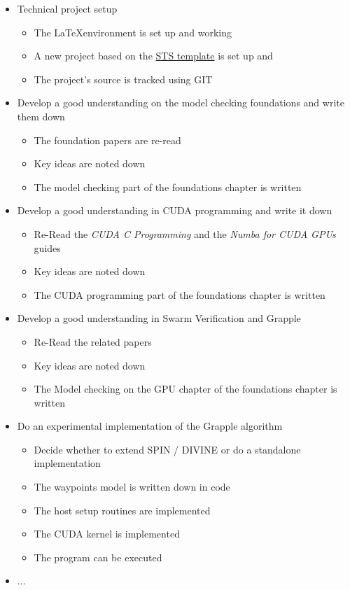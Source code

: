 \documentclass[a4paper]{scrartcl}
\begin{document}
\begin{itemize}
    \item Technical project setup
          \begin{itemize}
              \item The \LaTeX environment is set up and working
              \item A new project based on the \href{https://www.tuhh.de/t3resources/sts/downloads/report.zip}{STS template} is set up and
              \item The project's source is tracked using GIT
          \end{itemize}

    \item Develop a good understanding on the model checking foundations and write them down
          \begin{itemize}
              \item The foundation papers are re-read
              \item Key ideas are noted down
              \item The model checking part of the foundations chapter is written
          \end{itemize}

    \item Develop a good understanding in CUDA programming and write it down
          \begin{itemize}
              \item Re-Read the \emph{CUDA C Programming} and the \emph{Numba for CUDA GPUs} guides
              \item Key ideas are noted down
              \item The CUDA programming part of the foundations chapter is written
          \end{itemize}

    \item Develop a good understanding in Swarm Verification and Grapple
          \begin{itemize}
              \item Re-Read the related papers
              \item Key ideas are noted down
              \item The Model checking on the GPU chapter of the foundations chapter is written
          \end{itemize}

    \item Do an experimental implementation of the Grapple algorithm
          \begin{itemize}
              \item Decide whether to extend SPIN / DIVINE or do a standalone implementation
              \item The waypoints model is written down in code
              \item The host setup routines are implemented
              \item The CUDA kernel is implemented
              \item The program can be executed
          \end{itemize}

    \item $\dots$
\end{itemize}


\printbibliography[heading=bibintoc]
\end{document}
